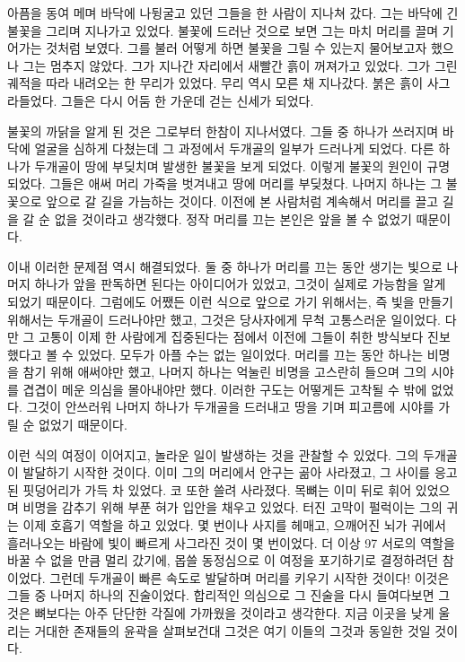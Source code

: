 아픔을 동여 메며 바닥에 나뒹굴고 있던 그들을 한 사람이 지나쳐 갔다. 그는 바닥에 긴 불꽃을 그리며 지나가고 있었다. 불꽃에 드러난 것으로 보면 그는 마치 머리를 끌며 기어가는 것처럼 보였다. 그를 불러 어떻게 하면 불꽃을 그릴 수 있는지 물어보고자 했으나 그는 멈추지 않았다. 그가 지나간 자리에서 새빨간 흙이 꺼져가고 있었다. 그가 그린 궤적을 따라 내려오는 한 무리가 있었다. 무리 역시 모른 채 지나갔다. 붉은 흙이 사그라들었다. 그들은 다시 어둠 한 가운데 걷는 신세가 되었다.



불꽃의 까닭을 알게 된 것은 그로부터 한참이 지나서였다. 그들 중 하나가 쓰러지며 바닥에 얼굴을 심하게 다쳤는데 그 과정에서 두개골의 일부가 드러나게 되었다. 다른 하나가 두개골이 땅에 부딪치며 발생한 불꽃을 보게 되었다. 이렇게 불꽃의 원인이 규명되었다. 그들은 애써 머리 가죽을 벗겨내고 땅에 머리를 부딪쳤다. 나머지 하나는 그 불꽃으로 앞으로 갈 길을 가늠하는 것이다. 이전에 본 사람처럼 계속해서 머리를 끌고 길을 갈 순 없을 것이라고 생각했다. 정작 머리를 끄는 본인은 앞을 볼 수 없었기 때문이다.



이내 이러한 문제점 역시 해결되었다. 둘 중 하나가 머리를 끄는 동안 생기는 빛으로 나머지 하나가 앞을 판독하면 된다는 아이디어가 있었고, 그것이 실제로 가능함을 알게 되었기 때문이다. 그럼에도 어쨌든 이런 식으로 앞으로 가기 위해서는, 즉 빛을 만들기 위해서는 두개골이 드러나야만 했고, 그것은 당사자에게 무척 고통스러운 일이었다. 다만 그 고통이 이제 한 사람에게 집중된다는 점에서 이전에 그들이 취한 방식보다 진보했다고 볼 수 있었다. 모두가 아플 수는 없는 일이었다. 머리를 끄는 동안 하나는 비명을 참기 위해 애써야만 했고, 나머지 하나는 억눌린 비명을 고스란히 들으며 그의 시야를 겹겹이 메운 의심을 몰아내야만 했다. 이러한 구도는 어떻게든 고착될 수 밖에 없었다. 그것이 안쓰러워 나머지 하나가 두개골을 드러내고 땅을 기며 피고름에 시야를 가릴 순 없었기 때문이다.



이런 식의 여정이 이어지고, 놀라운 일이 발생하는 것을 관찰할 수 있었다. 그의 두개골이 발달하기 시작한 것이다. 이미 그의 머리에서 안구는 곪아 사라졌고, 그 사이를 응고된 핏덩어리가 가득 차 있었다. 코 또한 쓸려 사라졌다. 목뼈는 이미 뒤로 휘어 있었으며 비명을 감추기 위해 부푼 혀가 입안을 채우고 있었다. 터진 고막이 펄럭이는 그의 귀는 이제 호흡기 역할을 하고 있었다. 몇 번이나 사지를 헤매고, 으깨어진 뇌가 귀에서 흘러나오는 바람에 빛이 빠르게 사그라진 것이 몇 번이었다. 더 이상 97 서로의 역할을 바꿀 수 없을 만큼 멀리 갔기에, 몹쓸 동정심으로 이 여정을 포기하기로 결정하려던 참이었다. 그런데 두개골이 빠른 속도로 발달하며 머리를 키우기 시작한 것이다! 이것은 그들 중 나머지 하나의 진술이었다. 합리적인 의심으로 그 진술을 다시 들여다보면 그것은 뼈보다는 아주 단단한 각질에 가까웠을 것이라고 생각한다. 지금 이곳을 낮게 울리는 거대한 존재들의 윤곽을 살펴보건대 그것은 여기 이들의 그것과 동일한 것일 것이다.



